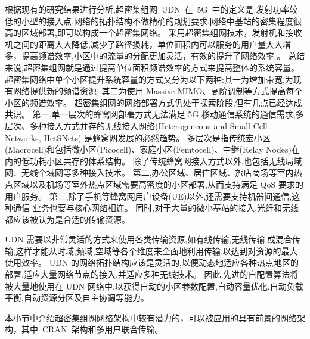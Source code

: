 根据现有的研究结果进行分析,超密集组网~UDN~在~5G~中的定义是:发射功率较低的小型的接入点,网络的拓扑结构不做精确的规划要求,网络中基站的密集程度很高的区域部署,即可以构成一个超密集网络。
采用超密集组网技术，发射机和接收机之间的距离大大降低,减少了路径损耗，单位面积内可以服务的用户量大大增多，提高频谱效率,小区中的流量的分配更加灵活，有效的提升了网络效率 。
总结来说,超密集组网就是通过提高单位面积频谱效率的方式来提高整体的系统容量。
超密集网络中单个小区提升系统容量的方式又分为以下两种:其一为增加带宽,为现有网络提供新的频谱资源;
其二为使用 Massive MIMO、高阶调制等方式提高每个小区的频谱效率。
超密集组网的网络部署方式仍处于探索阶段,但有几点已经达成共识。
第一,单一层次的蜂窝网部署方式无法满足 5G 移动通信系统的通信需求,多层次、多种接入方式并存的无线接入网络(Heterogeneous and Small Cell Networks, HetSNets)
是蜂窝网发展的必然趋势。
多层次是指传统宏小区(Macrocell)和包括微小区(Picocell)、家庭小区(Femtocell)、中继(Relay Nodes)在内的低功耗小区共存的体系结构。
除了传统蜂窝网接入方式以外,也包括无线局域网、无线个域网等多种接入技术。
第二,办公区域、居住区域、旅店商场等室内热点区域以及机场等室外热点区域需要高密度的小区部署,从而支持满足 QoS 要求的用户服务。
第三,除了手机等蜂窝网用户设备(UE)以外,还需要支持机器间通信,这种通信
业务也要与核心网络相连。
同时,对于大量的微小基站的接入,光纤和无线都应该被认为是合适的传输资源。

UDN 需要以非常灵活的方式来使用各类传输资源,如有线传输,无线传输,或混合传输,这样才能从时域,频域,空域等各个维度来全面地利用传输,以达到对资源的最大使用效率。
UDN 的网络拓扑结构应该是灵活的,以便动态地适应各种热点地区的部署,适应大量网络节点的接入,并适应多种无线技术。
因此,先进的自配置算法将被大量地使用在 UDN 网络中,以获得自动的小区参数配置,自动容量优化,自动负载平衡,自动资源分区及自主协调等能力。

本小节中介绍超密集组网网络架构中较有潜力的，可以被应用的具有前景的网络架构，其中~CRAN~架构和多用户联合传输。

